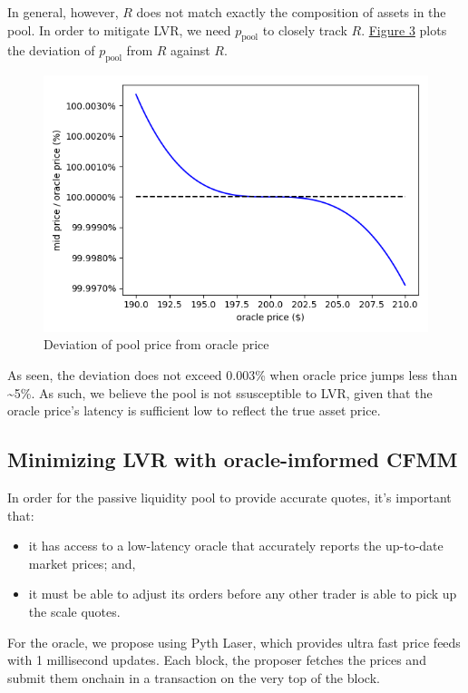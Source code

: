 \documentclass{article}
\begin{document}
In general, however, $R$ does not match exactly the composition of assets in the pool. In order to mitigate LVR, we need $p_{\mathrm{pool}}$ to closely track $R$. \hyperref[fig:3]{Figure 3} plots the deviation of $p_{\mathrm{pool}}$ from $R$ against $R$.

\begin{figure}
  \centering
  \includegraphics[width=4.5in]{3-solidly-pool-price-vs-oracle.png}
  \caption{Deviation of pool price from oracle price}
  \label{fig:3}
\end{figure}

As seen, the deviation does not exceed 0.003\% when oracle price jumps less than \textasciitilde 5\%. As such, we believe the pool is not ssusceptible to LVR, given that the oracle price's latency is sufficient low to reflect the true asset price.

\subsection{Minimizing LVR with oracle-imformed CFMM}

In order for the passive liquidity pool to provide accurate quotes, it's important that:

\begin{itemize}
  \item it has access to a low-latency oracle that accurately reports the up-to-date market prices; and,
  \item it must be able to adjust its orders before any other trader is able to pick up the scale quotes.
\end{itemize}

For the oracle, we propose using Pyth Laser,\supercite{pythlaser} which provides ultra fast price feeds with 1 millisecond updates. Each block, the proposer fetches the prices and submit them onchain in a transaction on the very top of the block.
\end{document}
